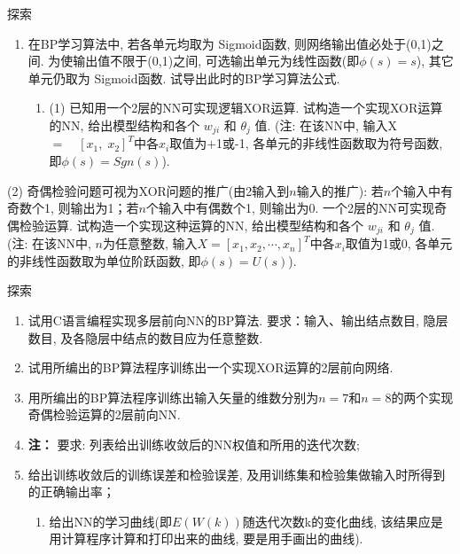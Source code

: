 \begin{custom}[explorecolor]{探索}
\begin{enumerate}
\item 在BP学习算法中, 若各单元均取为 Sigmoid函数, 则网络输出值必处于(0,1)之间. 为使输出值不限于(0,1)之间, 可选输出单元为线性函数(即$\phi(s)=s$), 其它单元仍取为 Sigmoid函数. 试导出此时的BP学习算法公式.
	\begin{enumerate}
	\item (1) 已知用一个2层的NN可实现逻辑XOR运算. 试构造一个实现XOR运算的NN, 给出模型结构和各个 $w_{ji} $ 和 $\theta_{j} $ 值. (注: 在该NN中, 输入X $= \quad [x_{1} ,\;x_{2} ]^{T}$中各$x_{i} $取值为$+$1或-1, 各单元的非线性函数取为符号函数, 即$\phi(s)=Sgn(s)$).
	\end{enumerate}
\end{enumerate}
(2) 奇偶检验问题可视为XOR问题的推广(由2输入到$n$输入的推广): 若$n$个输入中有奇数个1, 则输出为1；若$n$个输入中有偶数个1, 则输出为0. 一个2层的NN可实现奇偶检验运算. 试构造一个实现这种运算的NN, 给出模型结构和各个
$w_{ji} $ 和 $\theta_{j}$ 值. (注: 在该NN中, $n$为任意整数, 输入$X=[x_{1} , x_{2} ,\cdots, x_{n} ]^{T}$中各$x_{i}$取值为1或0, 各单元的非线性函数取为单位阶跃函数, 即$\phi(s)=U(s)$).
\end{custom}
\begin{custom}[explorecolor]{探索}
\begin{enumerate}
\item 试用C语言编程实现多层前向NN的BP算法. 要求：输入、输出结点数目, 隐层数目, 及各隐层中结点的数目应为任意整数.
\item 试用所编出的BP算法程序训练出一个实现XOR运算的2层前向网络.
\item 用所编出的BP算法程序训练出输入矢量的维数分别为$n=7$和$n=8$的两个实现奇偶检验运算的2层前向NN.
\item[\textbullet] \textbf{注： }要求: 列表给出训练收敛后的NN权值和所用的迭代次数;
\item 给出训练收敛后的训练误差和检验误差, 及用训练集和检验集做输入时所得到的正确输出率；
	\begin{enumerate}
	   \item 给出NN的学习曲线(即$E(W(k))$随迭代次数k的变化曲线, 该结果应是用计算程序计算和打印出来的曲线, 要是用手画出的曲线).
	\end{enumerate}
\end{enumerate}
\end{custom}
